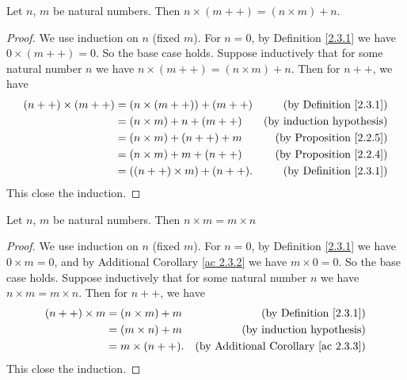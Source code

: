 \begin{additional corollary}\label{ac 2.3.3}
Let \(n\), \(m\) be natural numbers.
Then \(n \times (m++) = (n \times m) + n\).
\end{additional corollary}

\begin{proof}
    We use induction on \(n\) (fixed \(m\)).
    For \(n = 0\), by Definition \ref{2.3.1} we have \(0 \times (m++) = 0\).
    So the base case holds.
    Suppose inductively that for some natural number \(n\) we have \(n \times (m++) = (n \times m) + n\).
    Then for \(n++\), we have
    \begin{align*}
        (n++) \times (m++)
         & = (n \times (m++)) + (m++)  & \text{(by Definition \ref{2.3.1})}  \\
         & = (n \times m) + n + (m++)  & \text{(by induction hypothesis)}    \\
         & = (n \times m) + (n++) + m  & \text{(by Proposition \ref{2.2.5})} \\
         & = (n \times m) + m + (n++)  & \text{(by Proposition \ref{2.2.4})} \\
         & = ((n++) \times m) + (n++). & \text{(by Definition \ref{2.3.1})}
    \end{align*}
    This close the induction.
\end{proof}

\begin{lemma}\label{2.3.2}
    Let \(n\), \(m\) be natural numbers.
    Then \(n \times m = m \times n\)
\end{lemma}

\begin{proof}
    We use induction on \(n\) (fixed \(m\)).
    For \(n = 0\), by Definition \ref{2.3.1} we have \(0 \times m = 0\), and by Additional Corollary \ref{ac 2.3.2} we have \(m \times 0 = 0\).
    So the base case holds.
    Suppose inductively that for some natural number \(n\) we have \(n \times m = m \times n\).
    Then for \(n++\), we have
    \begin{align*}
        (n++) \times m & = (n \times m) + m & \text{(by Definition \ref{2.3.1})}              \\
                       & = (m \times n) + m & \text{(by induction hypothesis)}                \\
                       & = m \times (n++).  & \text{(by Additional Corollary \ref{ac 2.3.3})}
    \end{align*}
    This close the induction.
\end{proof}

